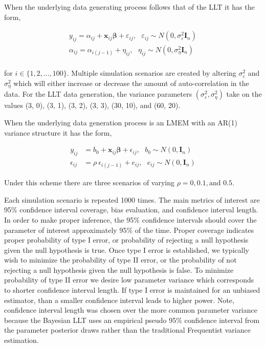 \documentclass[
]{article}
\begin{document}
When the underlying data generating process follows that of the LLT it has the form,

\begin{equation*}
\begin{aligned}
y_{ij} =  \alpha_{ij} + \boldsymbol{x}_{ij}\boldsymbol{\beta} + \varepsilon_{ij}, \ \ \ \varepsilon_{ij} \sim N(0,\sigma^2_\varepsilon \boldsymbol{I}_n)\\
\alpha_{ij} =  \alpha_{i(j-1)} + \eta_{ij}, \ \ \ \eta_{ij} \sim N(0,\sigma^2_\eta \boldsymbol{I}_n)\\
\end{aligned}
\end{equation*}

for \(i \in \{1, 2, ..., 100\}\). Multiple simulation scenarios are created by altering \(\sigma^2_\varepsilon\) and \(\sigma^2_\eta\) which will either increase or decrease the amount of auto-correlation in the data. For the LLT data generation, the variance parameters \((\sigma^2_\varepsilon, \sigma^2_\eta)\) take on the values (3, 0), (3, 1), (3, 2), (3, 3), (30, 10), and (60, 20).

When the underlying data generation process is an LMEM with an AR(1) variance structure it has the form,

\begin{equation*}
\begin{aligned}
y_{ij} &=  b_0 + \boldsymbol{x}_{ij} \boldsymbol{\beta} + \epsilon_{ij}, \ \ \ b_0 \sim N(0, \boldsymbol{I}_n)\\ 
\epsilon_{ij} &= \rho \ \epsilon_{i(j-1)} + e_{ij},\ \ \ e_{ij} \sim N(0, \boldsymbol{I}_n)
\end{aligned}
\end{equation*}

Under this scheme there are three scenarios of varying \(\rho = 0, 0.1, \text{and } 0.5\).

Each simulation scenario is repeated 1000 times. The main metrics of interest are 95\% confidence interval coverage, bias evaluation, and confidence interval length. In order to make proper inference, the 95\% confidence intervals should cover the parameter of interest approximately 95\% of the time. Proper coverage indicates proper probability of type I error, or probability of rejecting a null hypothesis given the null hypothesis is true. Once type I error is established, we typically wish to minimize the probability of type II error, or the probability of not rejecting a null hypothesis given the null hypothesis is false. To minimize probability of type II error we desire low parameter variance which corresponds to shorter confidence interval length. If type I error is maintained for an unbiased estimator, than a smaller confidence interval leads to higher power. Note, confidence interval length was chosen over the more common parameter variance because the Bayesian LLT uses an empirical pseudo 95\% confidence interval from the parameter posterior draws rather than the traditional Frequentist variance estimation.
\end{document}
